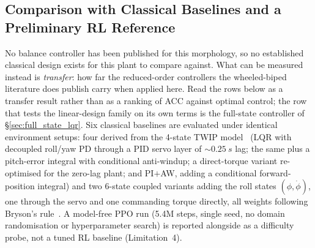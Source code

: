 \documentclass{jcd}
\begin{document}
\subsection{Comparison with Classical Baselines and a Preliminary RL Reference}
\label{sec:baselines}

No balance controller has been published for this morphology, so no established
classical design exists for this plant to compare against. What can be measured
instead is \emph{transfer}: how far the reduced-order controllers the
wheeled-biped literature does publish carry when applied here. Read the rows
below as a transfer result rather than as a ranking of ACC against optimal
control; the row that tests the linear-design family on its own terms is the
full-state controller of \S\ref{sec:full_state_lqr}. Six classical baselines are
evaluated under identical environment setups: four derived from the
4-state TWIP model~\citep{grasser2002joe} (LQR with decoupled roll/yaw PD
through a PID servo layer of ${\sim}\SI{0.25}{s}$ lag; the same plus a
pitch-error integral with conditional anti-windup; a direct-torque variant
re-optimised for the zero-lag plant; and PI$+$AW, adding a conditional
forward-position integral) and two 6-state coupled variants adding the roll
states $(\phi,\dot\phi)$, one through the servo and one commanding torque
directly, all weights following Bryson's rule~\citep{bryson1975optimal}. A model-free PPO run
(\num{5.4}M steps, single seed, no domain randomisation or hyperparameter
search) is reported alongside as a difficulty probe, not a tuned RL baseline
(Limitation~4).
\end{document}

